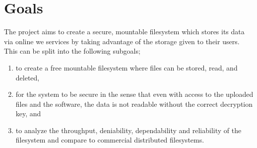 
\section{Goals}


The project aims to create a secure, mountable filesystem which stores its data via online we services by taking advantage of the storage given to their users. This can be split into the following subgoals;
\begin{enumerate}
\item to create a free mountable filesystem where files can be stored, read, and deleted, %
\item for the system to be secure in the sense that even with access to the uploaded files and the software, the data is not readable without the correct decryption key, and %
\item to analyze the throughput, deniability, dependability and reliability of the filesystem and compare to commercial distributed filesystems.
\end{enumerate}

